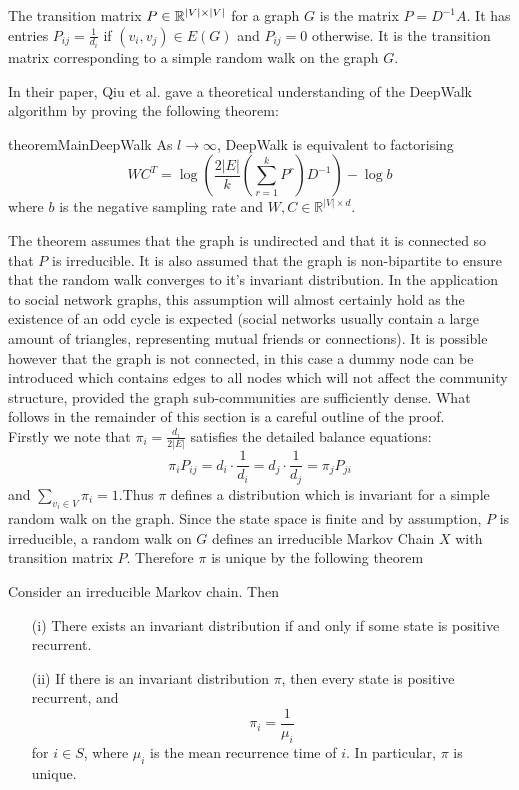 \documentclass[a4paper]{article}
\begin{document}
\begin{definition}
  The transition matrix $P \in \R^{|V| \times |V|}$ for a graph $G$ is the
  matrix $P = D^{-1}A$. It has entries $P_{ij} = \frac{1}{d_i}$ if $(v_i, v_j)
  \in E(G)$ and $P_{ij} = 0$ otherwise. It is the transition matrix
  corresponding to a simple random walk on the graph $G$. 
\end{definition}
In their paper, Qiu et al. gave a theoretical understanding of the DeepWalk
algorithm by proving the following theorem:
\begin{restatable}{theorem}{MainDeepWalk}
  As $l \to \infty$, DeepWalk is equivalent to factorising
  \[WC^T = \log{\left(\frac{2|E|}{k}\left( \sum_{r = 1}^k P^r  \right) D^{-1}
      \right)} - \log{b}\]
  where $b$ is the negative sampling rate and $W, C \in \mathbb{R}^{|V| \times d}$.
\end{restatable}
\noindent The theorem assumes that the graph is undirected and that it is connected so
that $P$ is irreducible. It is also assumed that the graph is
non-bipartite to ensure that the random walk converges to it's invariant distribution. In the application to
social network graphs, this
assumption will almost certainly hold as the existence of an odd cycle is
expected (social networks usually contain a large amount of triangles,
representing mutual friends or connections). It is possible however that the
graph is not connected, in this case a dummy node can be introduced which
contains edges to all nodes which will not affect the community structure,
provided the graph sub-communities are sufficiently dense.
What follows in the remainder of this section is a careful outline of the proof.\\
Firstly we note that $\pi_i = \frac{d_i}{2|E|}$ satisfies the detailed balance equations:
\[\pi_i P_{ij} = d_i\cdot \frac{1}{d_i} = d_j \cdot \frac{1}{d_j} = \pi_j P_{ji}\]
and $\sum_{v_i \in V} \pi_i = 1$.Thus $\pi$ defines a distribution which is
invariant for a simple random walk on the graph. Since the state space is
finite and by assumption, $P$ is irreducible, a random walk on $G$ defines an
irreducible Markov Chain $X$ with transition matrix $P$. Therefore $\pi$ is
unique by the following theorem
\begin{theorem}
  Consider an irreducible Markov chain. Then
  \begin{itemize}
  \item[(i)] There exists an invariant distribution if and only if some state is
    positive recurrent.
  \item[(ii)] If there is an invariant distribution $\pi$, then every state is
    positive recurrent, and
    \[\pi_i = \frac{1}{\mu_i}\]
    for $i \in S$, where $\mu_i$ is the mean recurrence time of $i$. In
    particular, $\pi$ is unique.
  \end{itemize}
\end{theorem}
\end{document}
